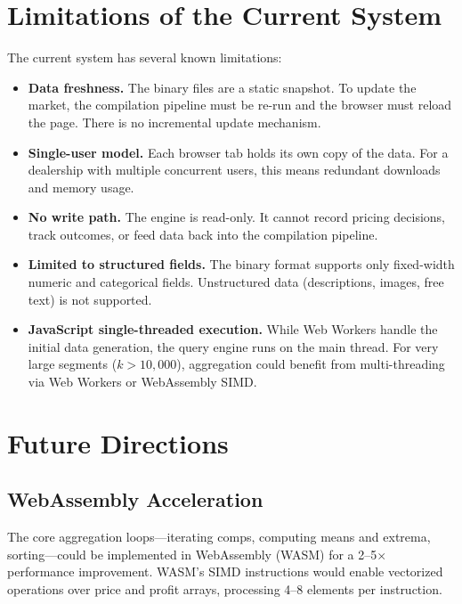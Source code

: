 \documentclass[11pt,a4paper,twoside]{book}
\begin{document}
\section{Limitations of the Current System}

The current system has several known limitations:

\begin{itemize}[leftmargin=*]
    \item \textbf{Data freshness.} The binary files are a static snapshot. To update the
          market, the compilation pipeline must be re-run and the browser must reload the
          page. There is no incremental update mechanism.
    \item \textbf{Single-user model.} Each browser tab holds its own copy of the data.
          For a dealership with multiple concurrent users, this means redundant downloads
          and memory usage.
    \item \textbf{No write path.} The engine is read-only. It cannot record pricing decisions,
          track outcomes, or feed data back into the compilation pipeline.
    \item \textbf{Limited to structured fields.} The binary format supports only fixed-width
          numeric and categorical fields. Unstructured data (descriptions, images, free text)
          is not supported.
    \item \textbf{JavaScript single-threaded execution.} While Web Workers handle the initial
          data generation, the query engine runs on the main thread. For very large segments
          ($k > 10,000$), aggregation could benefit from multi-threading via Web Workers or
          WebAssembly SIMD.
\end{itemize}

\section{Future Directions}

\subsection{WebAssembly Acceleration}

The core aggregation loops---iterating comps, computing means and extrema, sorting---could
be implemented in WebAssembly (WASM) for a 2--5$\times$ performance improvement. WASM's SIMD
instructions would enable vectorized operations over price and profit arrays, processing 4--8
elements per instruction.
\end{document}
